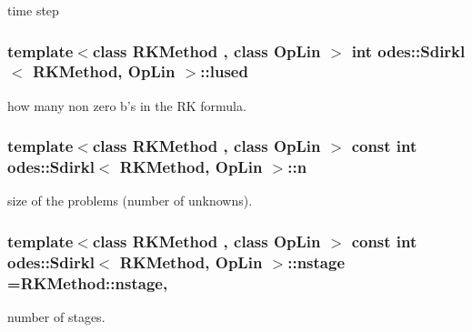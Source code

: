 time step 

\hypertarget{classodes_1_1Sdirkl_a9767ecd5dc2c32e369c09510afb9982d}{
\subsubsection[{lused}]{\setlength{\rightskip}{0pt plus 5cm}template$<$class R\-K\-Method , class Op\-Lin $>$ int {\bf odes\-::\-Sdirkl}$<$ R\-K\-Method, Op\-Lin $>$\-::lused\hspace{0.3cm}{\ttfamily [private]}}}\label{classodes_1_1Sdirkl_a9767ecd5dc2c32e369c09510afb9982d}
how many non zero b's in the R\-K formula. \hypertarget{classodes_1_1Sdirkl_a46a12e099af780050593f428c86c91c4}{
\subsubsection[{n}]{\setlength{\rightskip}{0pt plus 5cm}template$<$class R\-K\-Method , class Op\-Lin $>$ const int {\bf odes\-::\-Sdirkl}$<$ R\-K\-Method, Op\-Lin $>$\-::n\hspace{0.3cm}{\ttfamily [private]}}}\label{classodes_1_1Sdirkl_a46a12e099af780050593f428c86c91c4}


size of the problems (number of unknowns). 

\hypertarget{classodes_1_1Sdirkl_add32e0557722940c648c1c7aa147effd}{
\subsubsection[{nstage}]{\setlength{\rightskip}{0pt plus 5cm}template$<$class R\-K\-Method , class Op\-Lin $>$ const int {\bf odes\-::\-Sdirkl}$<$ R\-K\-Method, Op\-Lin $>$\-::nstage =R\-K\-Method\-::nstage\hspace{0.3cm}{\ttfamily [static]}, {\ttfamily [private]}}}\label{classodes_1_1Sdirkl_add32e0557722940c648c1c7aa147effd}


number of stages. 

